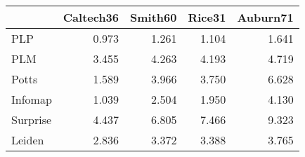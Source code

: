 \begin{tabular}{lrrrr}
\toprule
{} & Caltech36 & Smith60 & Rice31 & Auburn71 \\
\midrule
PLP      &     0.973 &   1.261 &  1.104 &    1.641 \\
PLM      &     3.455 &   4.263 &  4.193 &    4.719 \\
Potts    &     1.589 &   3.966 &  3.750 &    6.628 \\
Infomap  &     1.039 &   2.504 &  1.950 &    4.130 \\
Surprise &     4.437 &   6.805 &  7.466 &    9.323 \\
Leiden   &     2.836 &   3.372 &  3.388 &    3.765 \\
\bottomrule
\end{tabular}
